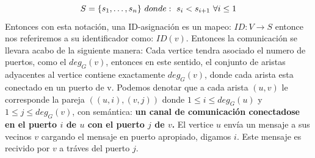 \documentclass[10pt]{report}
\begin{document}
    \begin{equation}
        S = \{ s_{1},\mathellipsis,s_{n}\} \
        donde:\ s_{i} < s_{i+1} \ \forall i\leq 1\label{eq:equation}
    \end{equation}
    Entonces con esta notación, una ID-asignación es un mapeo:
    $ID:V\rightarrow S$ entonce nos referiremos a su identificador como:
    $ID(v)$. \newline
    Entonces la comunicación se llevara acabo de la siguiente manera: \newline
    Cada vertice tendra asociado el numero de puertos, como el $deg_{G}(v)$,
    entonces en este sentido, el conjunto de aristas adyacentes al vertice
    contiene exactamente $deg_{G}(v)$, donde cada arista esta conectado en un puerto de v.
    \newline
    Podemos denotar que a cada arista $(u,v)$ le corresponde la pareja
    $((u,i),(v,j))$ donde $1\leq i \leq deg_{G}(u) $ y $1\leq j \leq deg_{G}(v)$,
    con semántica: \textbf{un canal de comunicación conectadose en el puerto $i$  de $u$ con el puerto $j$ de
    $v$.}\newline
    El vertice $u$ envía un mensaje a sus vecinos $v$ cargando el mensaje en puerto apropiado, digamos $i$.
    Este mensaje es recivido por $v$ a tráves del puerto $j$. \newline

\end{document}
